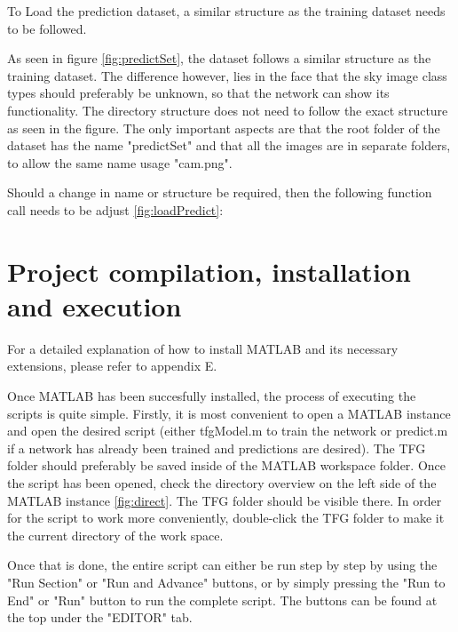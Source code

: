 To Load the prediction dataset, a similar structure as the training dataset needs to be followed.


As seen in figure \ref{fig:predictSet}, the dataset follows a similar structure as the training dataset. The difference however, lies in the face that the sky image class types should preferably be unknown, so that the network can show its functionality. The directory structure does not need to follow the exact structure as seen in the figure. The only important aspects are that the root folder of the dataset has the name "predictSet" and that all the images are in separate folders, to allow the same name usage "cam.png".

Should a change in name or structure be required, then the following function call\cite{mathworks:imgDstore} needs to be adjust \ref{fig:loadPredict}:

\section{Project compilation, installation and execution}
For a detailed explanation of how to install MATLAB and its necessary extensions, please refer to appendix E.

Once MATLAB has been succesfully installed, the process of executing the scripts is quite simple. Firstly, it is most convenient to open a MATLAB instance and open the desired script (either tfgModel.m to train the network or predict.m if a network has already been trained and predictions are desired). The TFG folder should preferably be saved inside of the MATLAB workspace folder. Once the script has been opened, check the directory overview on the left side of the MATLAB instance \ref{fig:direct}. The TFG folder should be visible there. In order for the script to work more conveniently, double-click the TFG folder to make it the current directory of the work space.


Once that is done, the entire script can either be run step by step by using the "Run Section" or "Run and Advance" buttons, or by simply pressing the "Run to End" or "Run" button to run the complete script. The buttons can be found at the top under the "EDITOR" tab.


